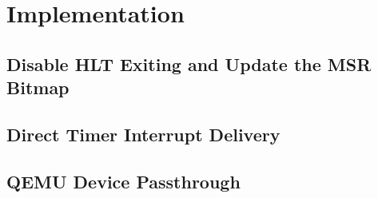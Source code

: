 \section{Implementation}


\subsection{Disable HLT Exiting and Update the MSR Bitmap}


\subsection{Direct Timer Interrupt Delivery}


\subsection{QEMU Device Passthrough}

